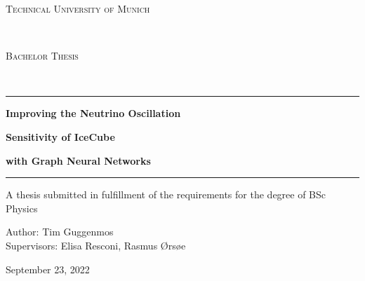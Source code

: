 \documentclass[a4paper,10pt]{scrartcl}
\begin{document}
\begin{center}
    \begin{huge}
        \textsc{Technical University of Munich}
    \end{huge}\\

    \vspace{2cm}

    \begin{Large}
        \textsc{Bachelor Thesis}
    \end{Large}\\

    \vspace{2cm}

    \par\noindent\rule{\textwidth}{0.2pt}
    \begin{huge}
        \textbf{Improving the Neutrino Oscillation\\}
    \end{huge}
    \vspace{0.1cm}
    \begin{huge}
        \textbf{Sensitivity of IceCube\\}
    \end{huge}
    \vspace{0.3cm}
    \begin{huge}
        \textbf{with Graph Neural Networks}
    \end{huge}
    \par\noindent\rule{\textwidth}{0.2pt}

    \vspace{2cm}

    A thesis submitted in fulfillment of the requirements for the degree of BSc Physics

    \vspace{2cm}

    \begin{large}
        Author: Tim Guggenmos\\
        \vspace{0.1cm}
        Supervisors: Elisa Resconi, Rasmus Ørsøe
    \end{large}

    \vspace*{\fill}

    \begin{large}
        September 23, 2022
    \end{large}

\end{center}
\end{document}
